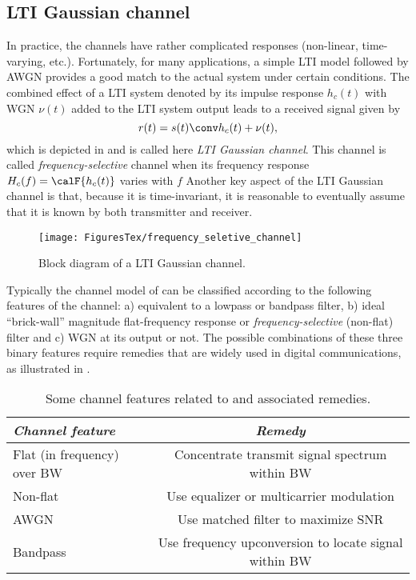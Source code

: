 \subsection{LTI Gaussian channel}

In practice, the channels have rather complicated responses (non-linear, time-varying, etc.). Fortunately, for many applications, a simple LTI model followed by AWGN provides a good match to the actual system under certain conditions. The combined effect of a LTI system denoted by its impulse response $h_c(t)$ with WGN $\nu(t)$ added to the LTI system output leads to a received signal given by
\begin{equation}
r(t) = s(t) \conv h_c(t) + \nu(t),
\label{eq:filtered_awgn_channel}
\end{equation}
which is depicted in  and is called here \emph{LTI Gaussian channel}. 
This channel is called \emph{frequency-selective} channel when its frequency response $H_c(f)=\calF \{ h_c(t) \}$ varies with $f$
Another key aspect of the LTI Gaussian channel is that, because it is time-invariant, it is reasonable to eventually assume that it is known by both transmitter and receiver.

\begin{figure}[htbp]
\centering
\texttt{[image: FiguresTex/frequency\_seletive\_channel]}
\caption{Block diagram of a LTI Gaussian channel.\label{fig:frequency_selective_channel}}
\end{figure}

Typically the channel model of  can be classified according to the following features of the channel: a) equivalent to a lowpass or bandpass filter, b) 
ideal ``brick-wall'' magnitude flat-frequency response or \emph{frequency-selective} (non-flat) filter and c) WGN at its output or not. The possible combinations of these three binary features 
require remedies that are widely used in digital communications, as illustrated in .

\begin{table}
\centering
\caption{Some channel features related to  and associated remedies.\label{tab:channel_medicines}}
\begin{tabular}{|l|c|}
\hline
\emph{Channel feature} & \emph{Remedy}\\ \hline
Flat (in frequency) over BW & Concentrate transmit signal spectrum within BW\\ \hline
Non-flat & Use equalizer  or multicarrier modulation \\ \hline
AWGN & Use matched filter to maximize SNR \\ \hline %
Bandpass & Use frequency upconversion to locate signal within BW\\ \hline
\end{tabular}
\end{table}

